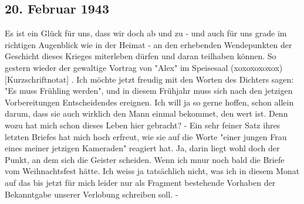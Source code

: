 \subsection{20. Februar 1943}

Es ist ein Gl\"{u}ck f\"{u}r uns, dass wir doch ab und zu - und auch f\"{u}r uns grade im richtigen Augenblick wie in der Heimat - an den erhebenden Wendepunkten der Geschicht dieses Krieges miterleben d\"{u}rfen und daran teilhaben k\"{o}nnen.
So gestern wieder der gewaltige Vortrag von "Alex" im Speisesaal (xoxoxoxoxox){\color{red} [Kurzschriftnotat] }.
Ich m\"{o}chte jetzt freudig  mit den Worten des Dichters sagen: "Es muss Fr\"{u}hling werden", und in diesem Fr\"{u}hjahr muss sich nach den jetzigen Vorbereitungen Entscheidendes ereignen.
Ich will ja so gerne hoffen, schon allein darum, dass sie auch wirklich den Mann einmal bekommet, den wert ist.
Denn wozu hat mich schon dieses Leben hier gebracht?
- Ein sehr feiner Satz ihres letzten Briefes hat mich hoch erfreut, wie sie auf die Worte "einer jungen Frau eines meiner jetzigen Kameraden" reagiert hat.
Ja, darin liegt wohl doch der Punkt, an dem sich die Geister scheiden.
Wenn ich mnur noch bald die Briefe vom Weihnachtsfest h\"{a}tte.
Ich weiss ja tats\"{a}chlich nicht, was ich in diesem Monat auf das bis jetzt f\"{u}r mich leider nur als Fragment bestehende Vorhaben der Bekanntgabe unserer Verlobung schreiben soll. -

\clearpage

